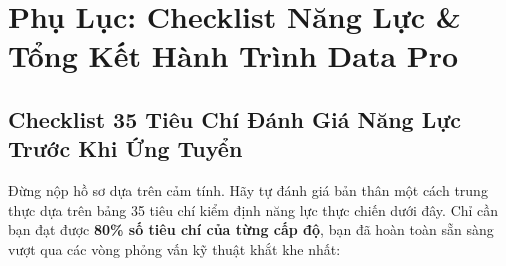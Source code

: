 \chapter{Phụ Lục: Checklist Năng Lực \& Tổng Kết Hành Trình Data Pro}

\section{Checklist 35 Tiêu Chí Đánh Giá Năng Lực Trước Khi Ứng Tuyển}

Đừng nộp hồ sơ dựa trên cảm tính. Hãy tự đánh giá bản thân một cách trung thực dựa trên bảng 35 tiêu chí kiểm định năng lực thực chiến dưới đây. Chỉ cần bạn đạt được \textbf{80\% số tiêu chí của từng cấp độ}, bạn đã hoàn toàn sẵn sàng vượt qua các vòng phỏng vấn kỹ thuật khắt khe nhất:

